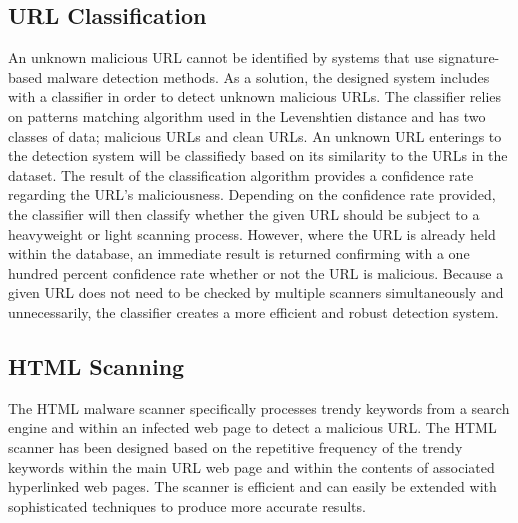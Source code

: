 \subsection{URL Classification}

An unknown malicious URL cannot be identified by systems that use signature-based malware detection methods. As a solution, the designed system includes with a classifier in order to detect unknown malicious URLs. The classifier relies on patterns matching algorithm used in the Levenshtien distance and has two classes of data; malicious URLs and clean URLs. An unknown URL enterings to the detection system will be classifiedy based on its similarity to the URLs in the dataset. The result of the classification algorithm provides a confidence rate regarding the URL’s maliciousness. Depending on the confidence rate provided, the classifier will then classify whether the given URL should be subject to a heavyweight or light scanning process. However, where the URL is already held within the database, an immediate result is returned confirming with a one hundred percent confidence rate whether or not the URL is malicious. Because a given URL does not need to be checked by multiple scanners simultaneously and unnecessarily, the classifier creates a more efficient and robust detection system. 
 
\subsection{HTML Scanning}

The HTML malware scanner specifically processes trendy keywords from a search engine and within an infected web page to detect a malicious URL. The HTML scanner has been designed based on the repetitive frequency of the trendy keywords within the main URL web page and within the contents of associated hyperlinked web pages. The scanner is efficient and can easily be extended with sophisticated techniques to produce more accurate results. 
